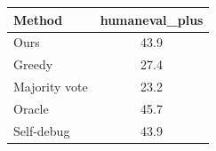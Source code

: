 \begin{tabular}{lc}
\toprule
Method & humaneval_plus \\
\midrule
Ours & 43.9 \\
Greedy & 27.4 \\
Majority vote & 23.2 \\
Oracle & 45.7 \\
Self-debug & 43.9 \\
\bottomrule
\end{tabular}
